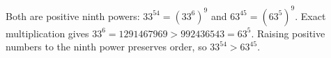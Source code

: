 Both are positive ninth powers: $33^{54}=(33^6)^9$ and $63^{45}=(63^5)^9$. Exact multiplication gives $33^6=1291467969>992436543=63^5$. Raising positive numbers to the ninth power preserves order, so $\boxed{33^{54}>63^{45}}$.
